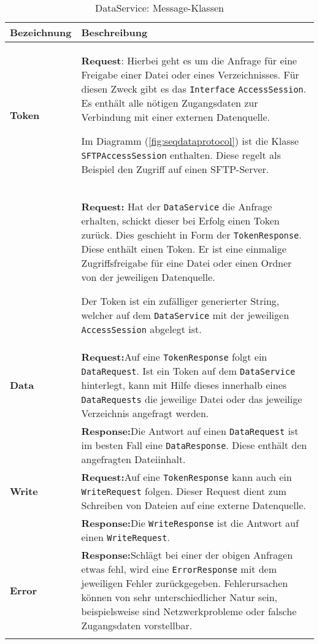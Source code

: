 \begin{longtable}{|p{4cm}| p{8cm}|}
  \hline
    \textbf{Bezeichnung} & \textbf{Beschreibung}\\\hline
    \textbf{Token} & \textbf{Request}:\newline 
    Hierbei geht es um die Anfrage für eine Freigabe einer Datei oder eines Verzeichnisses. Für diesen Zweck gibt es das \texttt{Interface} \texttt{AccessSession}. Es enthält alle nötigen Zugangsdaten zur Verbindung mit einer externen Datenquelle. \newline
    
    Im Diagramm (\autoref{fig:seqdataprotocol}) ist die Klasse \texttt{SFTPAccessSession} enthalten. Diese regelt als Beispiel den Zugriff auf einen SFTP-Server.\newline
    \\
     &    
    \textbf{Request:}\newline
    Hat der \texttt{DataService} die Anfrage erhalten, schickt dieser bei Erfolg einen Token zurück. Dies geschieht in Form der \texttt{TokenResponse}. Diese enthält einen \gls{Token}. Er ist eine einmalige Zugriffsfreigabe für eine Datei oder einen Ordner von der jeweiligen Datenquelle.\newline
    
    
    Der \gls{Token} ist ein zufälliger generierter String, welcher auf dem \texttt{DataService} mit der jeweiligen \texttt{AccessSession} abgelegt ist.\\\hline
    \textbf{Data} & \textbf{Request:}\newline Auf eine \texttt{TokenResponse} folgt ein \texttt{DataRequest}. Ist ein \gls{Token} auf dem \texttt{DataService} hinterlegt, kann mit Hilfe dieses innerhalb eines \texttt{DataRequests} die jeweilige Datei oder das jeweilige Verzeichnis angefragt werden.\newline \\
     & \textbf{Response:}\newline Die Antwort auf einen \texttt{DataRequest} ist im besten Fall eine \texttt{DataResponse}. Diese enthält den angefragten Dateiinhalt. \\\hline
     \textbf{Write} & \textbf{Request:}\newline Auf eine \texttt{TokenResponse} kann auch ein \texttt{WriteRequest} folgen. Dieser Request dient zum Schreiben von Dateien auf eine externe Datenquelle.\newline \\
     & \textbf{Response:}\newline Die \texttt{WriteResponse} ist die Antwort auf einen \texttt{WriteRequest}.  \\\hline
    \textbf{Error} & \textbf{Response:}\newline Schlägt bei einer der obigen Anfragen etwas fehl, wird eine \texttt{ErrorResponse} mit dem jeweiligen Fehler zurückgegeben. Fehlerursachen können von sehr unterschiedlicher Natur sein, beispielsweise sind Netzwerkprobleme oder falsche Zugangsdaten vorstellbar.\\\hline
        \caption{DataService: Message-Klassen}
    \label{dataservice-bodies}
\end{longtable}


